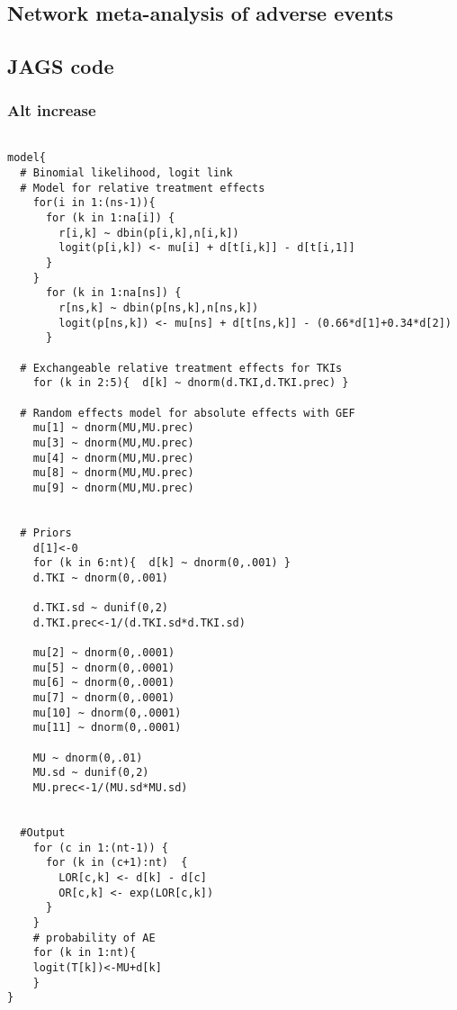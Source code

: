 \documentclass[11pt,final,fleqn]{article}\usepackage[]{graphicx}\usepackage[]{color}
\theoremstyle{plain}
\begin{document}
\begin{appendices}
\section{Network meta-analysis of adverse events}
\subsection{JAGS code}\label{sec:nma-ae-jags}



\subsubsection{Alt increase} 
\begin{verbatim} 

model{
  # Binomial likelihood, logit link
  # Model for relative treatment effects
    for(i in 1:(ns-1)){                  
      for (k in 1:na[i]) {               
        r[i,k] ~ dbin(p[i,k],n[i,k])     
        logit(p[i,k]) <- mu[i] + d[t[i,k]] - d[t[i,1]]  
      }
    }   
      for (k in 1:na[ns]) {               
        r[ns,k] ~ dbin(p[ns,k],n[ns,k])     
        logit(p[ns,k]) <- mu[ns] + d[t[ns,k]] - (0.66*d[1]+0.34*d[2])  
      }
  
  # Exchangeable relative treatment effects for TKIs
    for (k in 2:5){  d[k] ~ dnorm(d.TKI,d.TKI.prec) }
  
  # Random effects model for absolute effects with GEF
    mu[1] ~ dnorm(MU,MU.prec) 
    mu[3] ~ dnorm(MU,MU.prec) 
    mu[4] ~ dnorm(MU,MU.prec) 
    mu[8] ~ dnorm(MU,MU.prec) 
    mu[9] ~ dnorm(MU,MU.prec) 
       
       
  # Priors
    d[1]<-0                                     
    for (k in 6:nt){  d[k] ~ dnorm(0,.001) }     
    d.TKI ~ dnorm(0,.001)
    
    d.TKI.sd ~ dunif(0,2) 
    d.TKI.prec<-1/(d.TKI.sd*d.TKI.sd)
    
    mu[2] ~ dnorm(0,.0001)                     
    mu[5] ~ dnorm(0,.0001)                       
    mu[6] ~ dnorm(0,.0001)                       
    mu[7] ~ dnorm(0,.0001)                       
    mu[10] ~ dnorm(0,.0001)                       
    mu[11] ~ dnorm(0,.0001)                       
      
    MU ~ dnorm(0,.01)                         
    MU.sd ~ dunif(0,2) 
    MU.prec<-1/(MU.sd*MU.sd)
    
      
  #Output                                        
    for (c in 1:(nt-1)) {                        
      for (k in (c+1):nt)  { 
        LOR[c,k] <- d[k] - d[c]
        OR[c,k] <- exp(LOR[c,k])
      }  
    }
    # probability of AE
    for (k in 1:nt){ 
    logit(T[k])<-MU+d[k]
    }
}


\end{verbatim}
\end{appendices}
\end{document}
